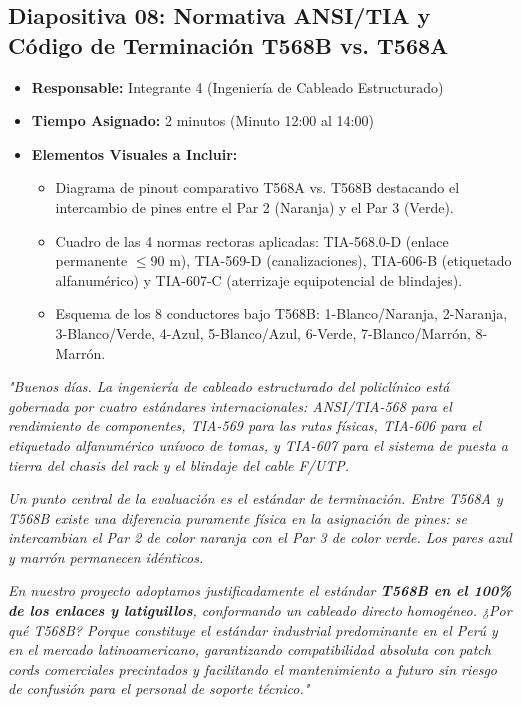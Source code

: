 \documentclass[11pt,a4paper]{article}
\begin{document}
\subsection{Diapositiva 08: Normativa ANSI/TIA y Código de Terminación T568B vs. T568A}
\begin{itemize}[leftmargin=*]
    \item \textbf{Responsable:} Integrante 4 (Ingeniería de Cableado Estructurado)
    \item \textbf{Tiempo Asignado:} 2 minutos (Minuto 12:00 al 14:00)
    \item \textbf{Elementos Visuales a Incluir:}
    \begin{itemize}
        \item Diagrama de pinout comparativo T568A vs. T568B destacando el intercambio de pines entre el Par 2 (Naranja) y el Par 3 (Verde).
        \item Cuadro de las 4 normas rectoras aplicadas: TIA-568.0-D (enlace permanente $\le 90$ m), TIA-569-D (canalizaciones), TIA-606-B (etiquetado alfanumérico) y TIA-607-C (aterrizaje equipotencial de blindajes).
        \item Esquema de los 8 conductores bajo T568B: 1-Blanco/Naranja, 2-Naranja, 3-Blanco/Verde, 4-Azul, 5-Blanco/Azul, 6-Verde, 7-Blanco/Marrón, 8-Marrón.
    \end{itemize}
\end{itemize}

\begin{tcolorbox}[colback=white,colframe=primaryblue,title=\textbf{Speech Verbal del Integrante 4 (Guion Palabra por Palabra)}]
\textit{"Buenos días. La ingeniería de cableado estructurado del policlínico está gobernada por cuatro estándares internacionales: ANSI/TIA-568 para el rendimiento de componentes, TIA-569 para las rutas físicas, TIA-606 para el etiquetado alfanumérico unívoco de tomas, y TIA-607 para el sistema de puesta a tierra del chasis del rack y el blindaje del cable F/UTP.}\par\vspace{2mm}
\textit{Un punto central de la evaluación es el estándar de terminación. Entre T568A y T568B existe una diferencia puramente física en la asignación de pines: se intercambian el Par 2 de color naranja con el Par 3 de color verde. Los pares azul y marrón permanecen idénticos.}\par\vspace{2mm}
\textit{En nuestro proyecto adoptamos justificadamente el estándar \textbf{T568B en el 100\% de los enlaces y latiguillos}, conformando un cableado directo homogéneo. ¿Por qué T568B? Porque constituye el estándar industrial predominante en el Perú y en el mercado latinoamericano, garantizando compatibilidad absoluta con patch cords comerciales precintados y facilitando el mantenimiento a futuro sin riesgo de confusión para el personal de soporte técnico."}
\end{tcolorbox}
\end{document}

